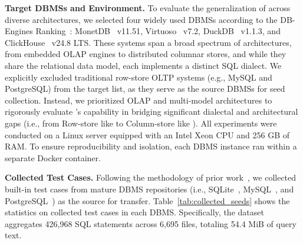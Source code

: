 \documentclass[sigconf,review,anonymous]{acmart}
\begin{document}
\textbf{Target DBMSs and Environment.}
To evaluate the generalization of \tool{} across diverse architectures, we selected four widely used DBMSs according to the DB-Engines Ranking~\cite{dbengines}: MonetDB~\cite{monetdb} v11.51, Virtuoso~\cite{virtuoso} v7.2, DuckDB~\cite{duckdb_git} v1.1.3, and ClickHouse~\cite{clickhouse} v24.8 LTS. These systems span a broad spectrum of architectures, from embedded OLAP engines to distributed columnar stores, and while they share the relational data model, each implements a distinct SQL dialect.
We explicitly excluded traditional row-store OLTP systems (e.g., MySQL and PostgreSQL) from the target list, as they serve as the source DBMSs for seed collection. Instead, we prioritized OLAP and multi-model architectures to rigorously evaluate \tool{}'s capability in bridging significant dialectal and architectural gaps (i.e., from Row-store like \mysql{} to Column-store like \duckdb{}).
All experiments were conducted on a Linux server equipped with an Intel Xeon CPU and 256 GB of RAM. To ensure reproducibility and isolation, each DBMS instance ran within a separate Docker container.

\textbf{Collected Test Cases.}
Following the methodology of prior work~\cite{fu2024sedar}, we collected built-in test cases from mature DBMS repositories (i.e., SQLite~\cite{sqlite}, MySQL~\cite{mysql}, and PostgreSQL~\cite{pg}) as the source for transfer. Table~\ref{tab:collected_seeds} shows the statistics on collected test cases in each DBMS.
Specifically, the dataset aggregates 426,968 SQL statements across 6,695 files, totaling 54.4 MiB of query text. 
\end{document}
